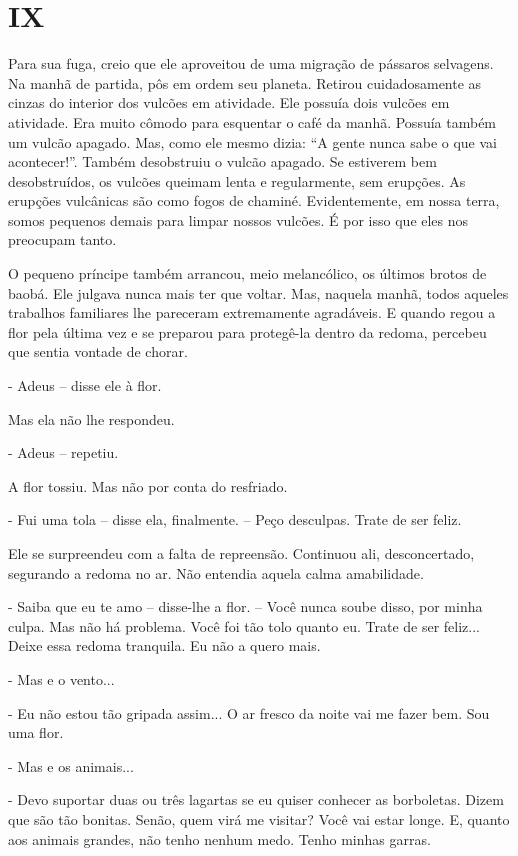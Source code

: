 \chapter{IX}

Para sua fuga, creio que ele aproveitou de uma migração de pássaros
selvagens. Na manhã de partida, pôs em ordem seu planeta. Retirou
cuidadosamente as cinzas do interior dos vulcões em atividade. Ele
possuía dois vulcões em atividade. Era muito cômodo para esquentar o
café da manhã. Possuía também um vulcão apagado. Mas, como ele mesmo
dizia: ``A gente nunca sabe o que vai acontecer!''. Também desobstruiu o
vulcão apagado. Se estiverem bem desobstruídos, os vulcões queimam lenta
e regularmente, sem erupções. As erupções vulcânicas são como fogos de
chaminé. Evidentemente, em nossa terra, somos pequenos demais para
limpar nossos vulcões. É por isso que eles nos preocupam tanto.

O pequeno príncipe também arrancou, meio melancólico, os últimos brotos
de baobá. Ele julgava nunca mais ter que voltar. Mas, naquela manhã,
todos aqueles trabalhos familiares lhe pareceram extremamente
agradáveis. E quando regou a flor pela última vez e se preparou para
protegê-la dentro da redoma, percebeu que sentia vontade de chorar.

- Adeus -- disse ele à flor.

Mas ela não lhe respondeu.

- Adeus -- repetiu.

A flor tossiu. Mas não por conta do resfriado.

- Fui uma tola -- disse ela, finalmente. -- Peço desculpas. Trate de ser
feliz.

Ele se surpreendeu com a falta de repreensão. Continuou ali,
desconcertado, segurando a redoma no ar. Não entendia aquela calma
amabilidade.

- Saiba que eu te amo -- disse-lhe a flor. -- Você nunca soube disso,
por minha culpa. Mas não há problema. Você foi tão tolo quanto eu. Trate
de ser feliz... Deixe essa redoma tranquila. Eu não a quero mais.

- Mas e o vento...

- Eu não estou tão gripada assim... O ar fresco da noite vai me fazer
bem. Sou uma flor.

- Mas e os animais...

- Devo suportar duas ou três lagartas se eu quiser conhecer as
borboletas. Dizem que são tão bonitas. Senão, quem virá me visitar? Você
vai estar longe. E, quanto aos animais grandes, não tenho nenhum medo.
Tenho minhas garras.


